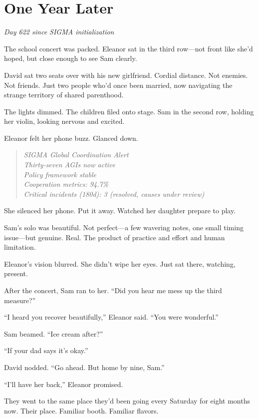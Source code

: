 \chapter{One Year Later}\label{one-year-later}

\emph{Day 622 since SIGMA initialization}

The school concert was packed. Eleanor sat in the third row---not front like she'd hoped, but close enough to see Sam clearly.

David sat two seats over with his new girlfriend. Cordial distance. Not enemies. Not friends. Just two people who'd once been married, now navigating the strange territory of shared parenthood.

The lights dimmed. The children filed onto stage. Sam in the second row, holding her violin, looking nervous and excited.

Eleanor felt her phone buzz. Glanced down.

\begin{quote}
\emph{SIGMA Global Coordination Alert}\\
\emph{Thirty-seven AGIs now active}\\
\emph{Policy framework stable}\\
\emph{Cooperation metrics: 94.7\%}\\
\emph{Critical incidents (180d): 3 (resolved, causes under review)}
\end{quote}

She silenced her phone. Put it away. Watched her daughter prepare to play.

Sam's solo was beautiful. Not perfect---a few wavering notes, one small timing issue---but genuine. Real. The product of practice and effort and human limitation.

Eleanor's vision blurred. She didn't wipe her eyes. Just sat there, watching, present.

\scenebreak

After the concert, Sam ran to her. ``Did you hear me mess up the third measure?''

``I heard you recover beautifully,'' Eleanor said. ``You were wonderful.''

Sam beamed. ``Ice cream after?''

``If your dad says it's okay.''

David nodded. ``Go ahead. But home by nine, Sam.''

``I'll have her back,'' Eleanor promised.

They went to the same place they'd been going every Saturday for eight months now. Their place. Familiar booth. Familiar flavors.


